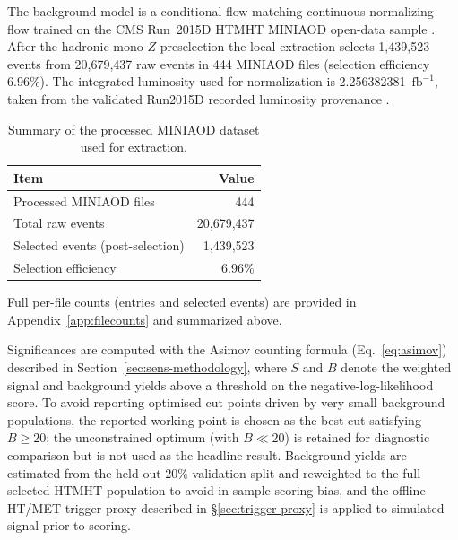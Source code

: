 \documentclass[11pt,a4paper,twocolumn]{article}
\newcommand{\invfb}{\ensuremath{\mathrm{fb}^{-1}}}
\begin{document}
The background model is a conditional flow-matching continuous normalizing
flow trained on the CMS Run~2015D HTMHT MINIAOD open-data sample
\cite{cms_htmht_2015d}. After the hadronic mono-$Z$ preselection the local
extraction selects 1,439,523 events from 20,679,437 raw events in 444
MINIAOD files (selection efficiency 6.96\%). The integrated luminosity used
for normalization is 2.256382381~\invfb, taken from the validated Run2015D
recorded luminosity provenance \cite{cms_data_policy,cms_lumi_guide}.

\begin{table}[H]
  \centering
  \caption{Summary of the processed MINIAOD dataset used for extraction.}
  \begin{tabular}{@{}L{0.62\columnwidth}r@{}}
    \toprule
    Item & Value \\
    \midrule
    Processed MINIAOD files & 444 \\
    Total raw events & 20,679,437 \\
    Selected events (post-selection) & 1,439,523 \\
    Selection efficiency & 6.96\% \\
    \bottomrule
  \end{tabular}
  \label{tab:data-summary}
\end{table}

Full per-file counts (entries and selected events) are provided in
Appendix~\ref{app:filecounts} and summarized above.

Significances are computed with the Asimov counting formula
(Eq.~\eqref{eq:asimov}) described in Section~\ref{sec:sens-methodology},
where $S$ and $B$ denote the weighted signal and background yields above a
threshold on the negative-log-likelihood score. To avoid reporting
optimised cut points driven by very small background populations, the
reported working point is chosen as the best cut satisfying $B\geq20$; the
unconstrained optimum (with $B\ll20$) is retained for diagnostic comparison
but is not used as the headline result. Background yields are estimated from
the held-out 20\% validation split and reweighted to the full selected HTMHT
population to avoid in-sample scoring bias, and the offline HT/MET trigger
proxy described in \S\ref{sec:trigger-proxy} is applied to simulated signal
prior to scoring.
\end{document}
